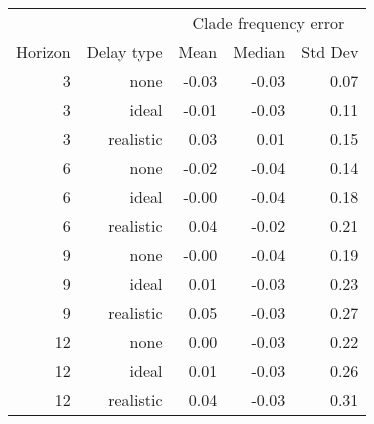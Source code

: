 
\begin{tabular*}{0.7\textwidth}{rrrrr}
\toprule
        &            & \multicolumn{3}{c}{Clade frequency error} \\
Horizon & Delay type & Mean & Median & Std Dev \\
\midrule

3 & none & -0.03 & -0.03 & 0.07 \\
3 & ideal & -0.01 & -0.03 & 0.11 \\
3 & realistic & 0.03 & 0.01 & 0.15 \\
6 & none & -0.02 & -0.04 & 0.14 \\
6 & ideal & -0.00 & -0.04 & 0.18 \\
6 & realistic & 0.04 & -0.02 & 0.21 \\
9 & none & -0.00 & -0.04 & 0.19 \\
9 & ideal & 0.01 & -0.03 & 0.23 \\
9 & realistic & 0.05 & -0.03 & 0.27 \\
12 & none & 0.00 & -0.03 & 0.22 \\
12 & ideal & 0.01 & -0.03 & 0.26 \\
12 & realistic & 0.04 & -0.03 & 0.31 \\

\bottomrule
\end{tabular*}

